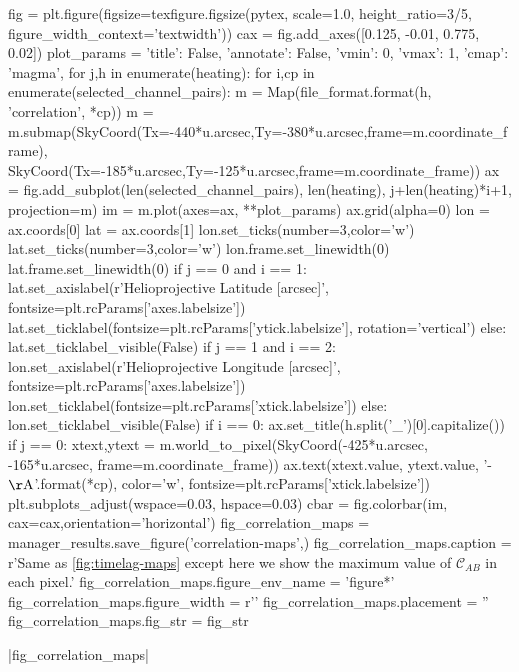 \begin{pycode}
fig = plt.figure(figsize=texfigure.figsize(pytex, scale=1.0, height_ratio=3/5,
                                           figure_width_context='textwidth'))
cax = fig.add_axes([0.125, -0.01, 0.775, 0.02])
plot_params = {'title': False, 'annotate': False, 'vmin': 0, 'vmax': 1, 'cmap': 'magma',}
for j,h in enumerate(heating):
    for i,cp in enumerate(selected_channel_pairs):
        m = Map(file_format.format(h, 'correlation', *cp))
        m = m.submap(SkyCoord(Tx=-440*u.arcsec,Ty=-380*u.arcsec,frame=m.coordinate_frame),
                     SkyCoord(Tx=-185*u.arcsec,Ty=-125*u.arcsec,frame=m.coordinate_frame))
        ax = fig.add_subplot(len(selected_channel_pairs), len(heating), j+len(heating)*i+1,
                             projection=m)
        im = m.plot(axes=ax, **plot_params)
        ax.grid(alpha=0)
        lon = ax.coords[0]
        lat = ax.coords[1]
        lon.set_ticks(number=3,color='w')
        lat.set_ticks(number=3,color='w')
        lon.frame.set_linewidth(0)
        lat.frame.set_linewidth(0)
        if j == 0 and i == 1:
            lat.set_axislabel(r'Helioprojective Latitude [arcsec]', fontsize=plt.rcParams['axes.labelsize'])
            lat.set_ticklabel(fontsize=plt.rcParams['ytick.labelsize'], rotation='vertical')
        else:
            lat.set_ticklabel_visible(False)
        if j == 1 and i == 2:
            lon.set_axislabel(r'Helioprojective Longitude [arcsec]', fontsize=plt.rcParams['axes.labelsize'])
            lon.set_ticklabel(fontsize=plt.rcParams['xtick.labelsize'])
        else:
            lon.set_ticklabel_visible(False)
        if i == 0:
            ax.set_title(h.split('_')[0].capitalize())
        if j == 0:
            xtext,ytext = m.world_to_pixel(SkyCoord(-425*u.arcsec, -165*u.arcsec, frame=m.coordinate_frame))
            ax.text(xtext.value, ytext.value, '{}-{} $\mathrm{{\AA}}$'.format(*cp),
                    color='w', fontsize=plt.rcParams['xtick.labelsize'])
plt.subplots_adjust(wspace=0.03, hspace=0.03)
cbar = fig.colorbar(im, cax=cax,orientation='horizontal')
fig_correlation_maps = manager_results.save_figure('correlation-maps',)
fig_correlation_maps.caption = r'Same as \autoref{fig:timelag-maps} except here we show the maximum value of $\mathcal{C}_{AB}$ in each pixel.'
fig_correlation_maps.figure_env_name = 'figure*'
fig_correlation_maps.figure_width = r'\textwidth'
fig_correlation_maps.placement = ''
fig_correlation_maps.fig_str = fig_str
\end{pycode}
|fig_correlation_maps|

